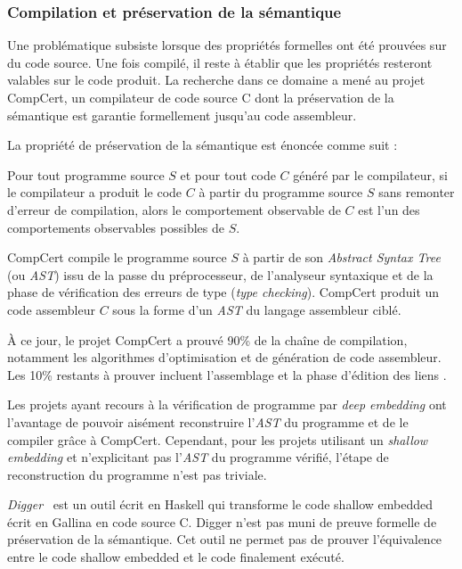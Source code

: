 			\subsubsection{Compilation et préservation de la sémantique}
			\label{compilation}
				Une problématique subsiste lorsque des propriétés formelles ont été prouvées sur du code source. Une fois compilé, il reste à établir que les propriétés resteront valables sur le code produit. La recherche dans ce domaine a mené au projet CompCert\cite{Leroy-backend}, un compilateur de code source C dont la préservation de la sémantique est garantie formellement jusqu'au code assembleur.

	La propriété de préservation de la sémantique est énoncée comme suit :

\begin{theorem}	
	Pour tout programme source $S$ et pour tout code $C$ généré par le compilateur, si le compilateur a produit le code $C$ à partir du programme source $S$ sans remonter d'erreur de compilation, alors le comportement observable de $C$ est l'un des comportements observables possibles de $S$.
\end{theorem}

CompCert compile le programme source $S$ à partir de son \emph{Abstract Syntax Tree} (ou \emph{AST}) issu de la passe du préprocesseur, de l'analyseur syntaxique et de la phase de vérification des erreurs de type (\emph{type checking}). CompCert produit un code assembleur $C$ sous la forme d'un \emph{AST} du langage assembleur ciblé.

À ce jour, le projet CompCert a prouvé 90\% de la chaîne de compilation, notamment les algorithmes d'optimisation et de génération de code assembleur. Les 10\% restants à prouver incluent l'assemblage et la phase d'édition des liens \cite{compcert_online}.

Les projets ayant recours à la vérification de programme par \emph{deep embedding} ont l'avantage de pouvoir aisément reconstruire l'\emph{AST} du programme et de le compiler grâce à CompCert. Cependant, pour les projets utilisant un \emph{shallow embedding} et n'explicitant pas l'\emph{AST} du programme vérifié, l'étape de reconstruction du programme n'est pas triviale.

\emph{Digger}~\cite{digger} est un outil écrit en Haskell qui transforme le code shallow embedded écrit en Gallina en code source C. Digger n'est pas muni de preuve formelle de préservation de la sémantique. Cet outil ne permet pas de prouver l'équivalence entre le code shallow embedded et le code finalement exécuté.

